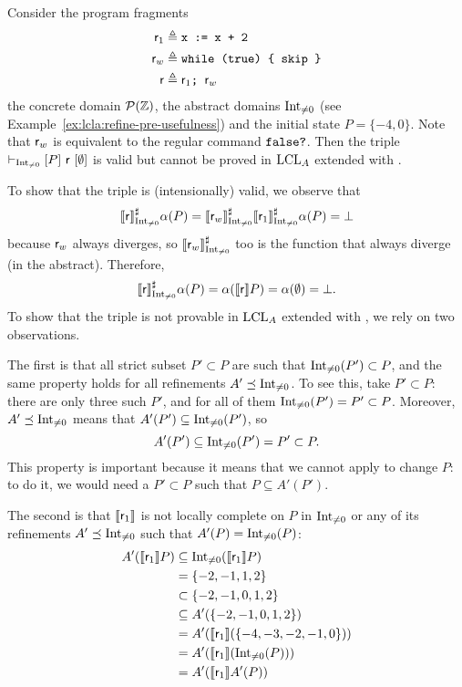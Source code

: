 \begin{example}\label{ex:lcla:refine-pre-incomplete}
	Consider the program fragments
	\begin{align*}
		\mathsf{r}_1 &\triangleq \texttt{x := x + 2} \\
		\mathsf{r}_w &\triangleq \texttt{while (true) \{ skip \}} \\
		\mathsf{r} &\triangleq \mathsf{r}_1 \texttt{; }\mathsf{r}_w
	\end{align*}
	the concrete domain $\mathcal{P}(\mathbb{Z})$, the abstract domains $\text{Int}_{\neq 0}$ (see Example~\ref{ex:lcla:refine-pre-usefulness}) and the initial state $P = \{ -4, 0 \}$. 
	Note that $\mathsf{r}_w$ is equivalent to the regular command $\texttt{false?}$.
	Then the triple $\vdash_{\text{Int}_{\neq 0}}\nobreak[P]~\mathsf{r}~[\emptyset]$ is valid but cannot be proved in $\text{LCL}_A$ extended with .
	
	To show that the triple is (intensionally) valid, we observe that
	\[
	\llbracket\mathsf{r}\rrbracket^{\sharp}_{\text{Int}_{\neq 0}} \alpha(P) = \llbracket\mathsf{r}_w\rrbracket^{\sharp}_{\text{Int}_{\neq 0}} \llbracket\mathsf{r}_1\rrbracket^{\sharp}_{\text{Int}_{\neq 0}} \alpha(P) = \bot
	\]
	because $\mathsf{r}_w$ always diverges, so $\llbracket\mathsf{r}_w\rrbracket^{\sharp}_{\text{Int}_{\neq 0}}$ too is the function that always diverge (in the abstract). Therefore,
	\[
	\llbracket\mathsf{r}\rrbracket^{\sharp}_{\text{Int}_{\neq 0}} \alpha(P) = \alpha(\llbracket\mathsf{r}\rrbracket P) = \alpha(\emptyset) = \bot .
	\]
	To show that the triple is not provable in $\text{LCL}_A$ extended with , we rely on two observations.
	
	The first is that all strict subset $P' \subset P$ are such that $\text{Int}_{\neq 0}(P') \subset P$, and the same property holds for all refinements $A' \preceq \text{Int}_{\neq 0}$. To see this, take $P' \subset P$: there are only three such $P'$, and for all of them $\text{Int}_{\neq 0}(P') = P' \subset P$. Moreover, $A' \preceq \text{Int}_{\neq 0}$ means that $A'(P') \subseteq \text{Int}_{\neq 0}(P')$, so
	\[
	A'(P') \subseteq \text{Int}_{\neq 0}(P') = P' \subset P .
	\]
	This property is important because it means that we cannot apply  to change $P$: to do it, we would need a $P' \subset P$ such that $P \subseteq A'(P')$.
	
	The second is that $\llbracket\mathsf{r}_1\rrbracket$ is not locally complete on $P$ in $\text{Int}_{\neq 0}$ or any of its refinements $A' \preceq \text{Int}_{\neq 0}$ such that $A'(P) = \text{Int}_{\neq 0}(P)$:
	\begin{align*}
		A'(\llbracket\mathsf{r}_1\rrbracket P) &\subseteq \text{Int}_{\neq 0}(\llbracket\mathsf{r}_1\rrbracket P) \\
		&= \{ -2, -1, 1, 2 \} \\
		&\subset \{ -2, -1, 0, 1, 2 \} \\
		&\subseteq A'(\{ -2, -1, 0, 1, 2 \}) \\
		&= A'(\llbracket\mathsf{r}_1\rrbracket (\{ -4, -3, -2, -1, 0 \})) \\
		&= A'(\llbracket\mathsf{r}_1\rrbracket (\text{Int}_{\neq 0}(P))) \\
		&= A'(\llbracket\mathsf{r}_1\rrbracket A'(P))
	\end{align*}
	

\end{example}
